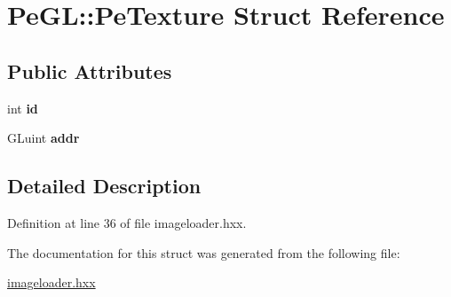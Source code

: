 \hypertarget{structPeGL_1_1PeTexture}{\section{Pe\-G\-L\-:\-:Pe\-Texture Struct Reference}
\label{structPeGL_1_1PeTexture}
}
\subsection*{Public Attributes}
\begin{DoxyCompactItemize}
\item 
\hypertarget{structPeGL_1_1PeTexture_a7295aa38a0fb0db3a6a77c592fb3e868}{int {\bfseries id}}\label{structPeGL_1_1PeTexture_a7295aa38a0fb0db3a6a77c592fb3e868}

\item 
\hypertarget{structPeGL_1_1PeTexture_a09f655f6deb304d201dd2b894cabe0f3}{G\-Luint {\bfseries addr}}\label{structPeGL_1_1PeTexture_a09f655f6deb304d201dd2b894cabe0f3}

\end{DoxyCompactItemize}


\subsection{Detailed Description}


Definition at line 36 of file imageloader.\-hxx.



The documentation for this struct was generated from the following file\-:\begin{DoxyCompactItemize}
\item 
\hyperlink{imageloader_8hxx}{imageloader.\-hxx}\end{DoxyCompactItemize}
